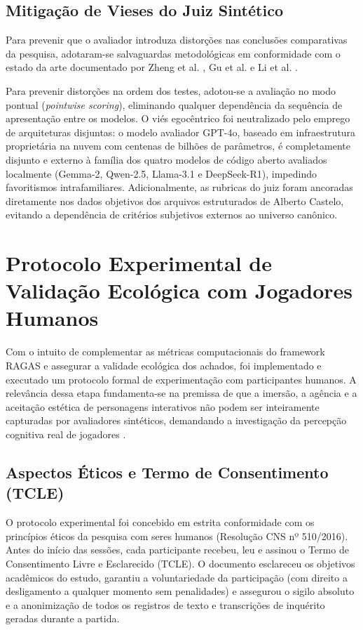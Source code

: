 \subsection{Mitigação de Vieses do Juiz Sintético}
\label{subsec:met_mitigacao_vieses}

Para prevenir que o avaliador introduza distorções nas conclusões comparativas da pesquisa, adotaram-se salvaguardas metodológicas em conformidade com o estado da arte documentado por Zheng et al. \cite{zheng2023judging}, Gu et al. \cite{gu2024survey} e Li et al. \cite{li2025generation}.

Para prevenir distorções na ordem dos testes, adotou-se a avaliação no modo pontual (\textit{pointwise scoring}), eliminando qualquer dependência da sequência de apresentação entre os modelos. O viés egocêntrico foi neutralizado pelo emprego de arquiteturas disjuntas: o modelo avaliador GPT-4o, baseado em infraestrutura proprietária na nuvem com centenas de bilhões de parâmetros, é completamente disjunto e externo à família dos quatro modelos de código aberto avaliados localmente (Gemma-2, Qwen-2.5, Llama-3.1 e DeepSeek-R1), impedindo favoritismos intrafamiliares. Adicionalmente, as rubricas do juiz foram ancoradas diretamente nos dados objetivos dos arquivos estruturados de Alberto Castelo, evitando a dependência de critérios subjetivos externos ao universo canônico.

\section{Protocolo Experimental de Validação Ecológica com Jogadores Humanos}
\label{sec:met_validacao_humana}

Com o intuito de complementar as métricas computacionais do framework RAGAS e assegurar a validade ecológica dos achados, foi implementado e executado um protocolo formal de experimentação com participantes humanos. A relevância dessa etapa fundamenta-se na premissa de que a imersão, a agência e a aceitação estética de personagens interativos não podem ser inteiramente capturadas por avaliadores sintéticos, demandando a investigação da percepção cognitiva real de jogadores \cite{bowman2007virtual}.

\subsection{Aspectos Éticos e Termo de Consentimento (TCLE)}
O protocolo experimental foi concebido em estrita conformidade com os princípios éticos da pesquisa com seres humanos (Resolução CNS nº 510/2016). Antes do início das sessões, cada participante recebeu, leu e assinou o Termo de Consentimento Livre e Esclarecido (TCLE). O documento esclareceu os objetivos acadêmicos do estudo, garantiu a voluntariedade da participação (com direito a desligamento a qualquer momento sem penalidades) e assegurou o sigilo absoluto e a anonimização de todos os registros de texto e transcrições de inquérito geradas durante a partida.

